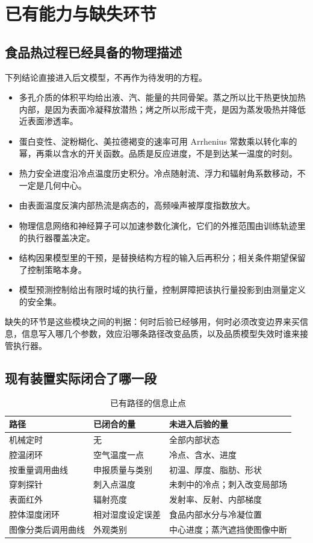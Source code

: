 \chapter{已有能力与缺失环节}

\section{食品热过程已经具备的物理描述}

下列结论直接进入后文模型，不再作为待发明的方程。

\begin{itemize}
\item 多孔介质的体积平均给出液、汽、能量的共同骨架。蒸之所以比干热更快加热内部，是因为表面冷凝释放潜热；烤之所以形成干壳，是因为蒸发吸热并降低近表面渗透率。
\item 蛋白变性、淀粉糊化、美拉德褐变的速率可用 Arrhenius 常数乘以转化率的幂，再乘以含水的开关函数。品质是反应进度，不是到达某一温度的时刻。
\item 热力安全进度沿冷点温度历史积分。冷点随射流、浮力和辐射角系数移动，不一定是几何中心。
\item 由表面温度反演内部热流是病态的，高频噪声被厚度指数放大。
\item 物理信息网络和神经算子可以加速参数化演化，它们的外推范围由训练轨迹里的执行器覆盖决定。
\item 结构因果模型里的干预，是替换结构方程的输入后再积分；相关条件期望保留了控制策略本身。
\item 模型预测控制给出有限时域的执行量，控制屏障把该执行量投影到由测量定义的安全集。
\end{itemize}

缺失的环节是这些模块之间的判据：何时后验已经够用，何时必须改变边界来买信息，信息写入哪几个参数，效应沿哪条路径改变品质，以及品质模型失效时谁来接管执行器。

\section{现有装置实际闭合了哪一段}

\begin{table}[H]
\centering
\caption{已有路径的信息止点}
\begin{tabularx}{\textwidth}{lXX}
\toprule
路径 & 已闭合的量 & 未进入后验的量 \\
\midrule
机械定时 & 无 & 全部内部状态 \\
腔温闭环 & 空气温度一点 & 冷点、含水、进度 \\
按重量调用曲线 & 申报质量与类别 & 初温、厚度、脂肪、形状 \\
穿刺探针 & 刺入点温度 & 未刺中的冷点；刺入改变局部场 \\
表面红外 & 辐射亮度 & 发射率、反射、内部梯度 \\
腔体湿度闭环 & 相对湿度设定误差 & 食品内部水分与冷凝位置 \\
图像分类后调用曲线 & 外观类别 & 中心进度；蒸汽遮挡使图像中断 \\
\bottomrule
\end{tabularx}
\end{table}

